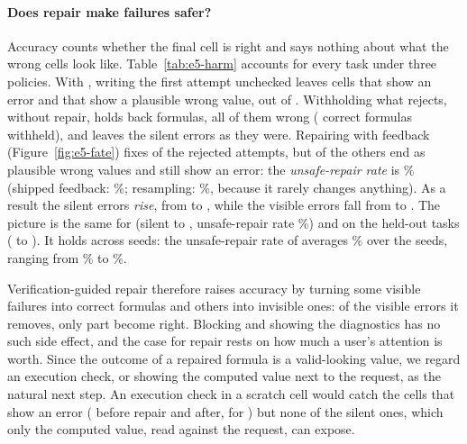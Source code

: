 \paragraph{Does repair make failures safer?}
Accuracy counts whether the final cell is right and says nothing about what the wrong cells look like. Table~\ref{tab:e5-harm} accounts for every task under three policies. With \efAName, writing the first attempt unchecked leaves \hmAAsIsLoud{} cells that show an error and \hmAAsIsSilent{} that show a plausible wrong value, out of \hmAN. Withholding what \gc{} rejects, without repair, holds back \hmABlockWithheld{} formulas, all of them wrong (\hmAFalseWithheld{} correct formulas withheld), and leaves the silent errors as they were. Repairing with \gc{} feedback (Figure~\ref{fig:e5-fate}) fixes \hmAUnsafeVtwoFixed{} of the \hmAUnsafeN{} rejected attempts, but of the others \hmAUnsafeVtwo{} end as plausible wrong values and \hmAUnsafeVtwoLoud{} still show an error: the \emph{unsafe-repair rate} is \hmAUnsafeVtwoRate\% (shipped feedback: \hmAUnsafeVoneRate\%; resampling: \hmAUnsafeResRate\%, because it rarely changes anything). As a result the silent errors \emph{rise}, from \hmAAsIsSilent{} to \hmARepVtwoSilent, while the visible errors fall from \hmAAsIsLoud{} to \hmARepVtwoLoud. The picture is the same for \efBName{} (silent \hmBAsIsSilent{} to \hmBRepVtwoSilent, unsafe-repair rate \hmBUnsafeVtwoRate\%) and on the held-out tasks (\hmCAsIsSilent{} to \hmCRepVtwoSilent). \ifdefined\sdASeeds It holds across seeds: the unsafe-repair rate of \efAName{} averages \sdAUnsafevtwofb\% over the \sdASeeds{} seeds, ranging from \sdAUnsafevtwofbMin\% to \sdAUnsafevtwofbMax\%.\fi



Verification-guided repair therefore raises accuracy by turning some visible failures into correct formulas and others into invisible ones: of the visible errors it removes, only part become right. Blocking and showing the diagnostics has no such side effect, and the case for repair rests on how much a user's attention is worth. Since the outcome of a repaired formula is a valid-looking value, we regard an execution check, or showing the computed value next to the request, as the natural next step. An execution check in a scratch cell would catch the cells that show an error (\hmAAsIsLoud{} before repair and \hmARepVtwoLoud{} after, for \efAName) but none of the silent ones, which only the computed value, read against the request, can expose.

